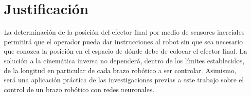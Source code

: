 \section{Justificación}

La determinación de la posición del efector final por medio de sensores inerciales permitirá que el operador pueda dar instrucciones al robot sin que sea necesario que conozca la posición en el espacio de dónde debe de colocar el efector final. La solución a la cinemática inversa no dependerá, dentro de los límites establecidos, de la longitud en particular de cada brazo robótico a ser controlar. Asimismo, será una aplicación práctica de las investigaciones previas a este trabajo sobre el control de un brazo robótico con redes neuronales.